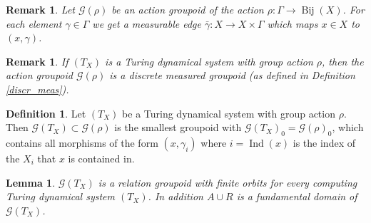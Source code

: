 \documentclass[12pt,a4paper]{scrartcl}
\theoremstyle{plain}
\newtheorem{Lemma}[Theorem]{Lemma}
\newtheorem{Remark}[Theorem]{Remark}
\theoremstyle{definition}
\newtheorem{Definition}[Theorem]{Definition}
\numberwithin{equation}{section}
\newcommand{\2}{\mathbb{Z} / 2 \mathbb{Z}}
\newcommand{\G}{\mathcal{G}}
\newcommand{\1}{\bar{1}}
\newcommand{\0}{\bar{0}}
\newcommand{\Bij}{\operatorname{Bij}}
\newcommand{\Ind}{\operatorname{Ind}}
\begin{document}
\begin{Remark} \label{mE_action_groupoid}
	Let $\G(\rho)$ be an action groupoid of the action $\rho \colon \Gamma \to \Bij(X)$. For each element $\gamma \in \Gamma$ we get a measurable edge $\bar{\gamma}\colon X \to X \times \Gamma$ which maps $x \in X$ to $(x, \gamma)$.
\end{Remark}



\begin{Remark}
	If $(T_X)$ is a Turing dynamical system with group action $\rho$, then the action groupoid $\G(\rho)$ is a discrete measured groupoid (as defined in Definition \ref{discr_meas}).
\end{Remark}
\begin{Definition}
	Let $(T_X)$ be a Turing dynamical system with group action $\rho$. Then $\G (T_X) \subset \G(\rho)$ is the smallest groupoid with $\G (T_X)_0 = \G(\rho)_0$, which contains all morphisms of the form $(x, \gamma_i)$ where $i = \Ind(x)$ is the index of the $X_i$ that $x$ is contained in.
\end{Definition}
\begin{Lemma} \label{TX_rel_groupoid}
	$\G (T_X)$ is a relation groupoid with finite orbits for every computing Turing dynamical system $(T_X)$. In addition $A \cup R$ is a fundamental domain of $\G (T_X)$.
\end{Lemma}
\end{document}
